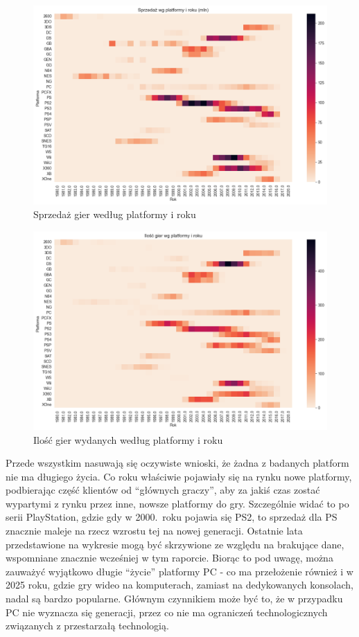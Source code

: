 \documentclass[11pt]{article}
\begin{document}
\begin{figure}[H]
    \centering
    \includegraphics[width=\linewidth]{figures/rokplatforma-sprzedaz}
    \caption{Sprzedaż gier według platformy i roku}
    \label{fig:platform-year-sales}
\end{figure}

\begin{figure}[H]
    \centering
    \includegraphics[width=\linewidth]{figures/rokplatforma-ilosc}
    \caption{Ilość gier wydanych według platformy i roku}
    \label{fig:platform-year-count}
\end{figure}

Przede wszystkim nasuwają się oczywiste wnioski, że żadna z badanych platform nie ma długiego życia.
Co roku właściwie pojawiały się na rynku nowe platformy, podbierając część klientów od ``głównych graczy'', aby za jakiś czas zostać wypartymi z rynku przez inne, nowsze platformy do gry.
Szczególnie widać to po serii PlayStation, gdzie gdy w 2000.~roku pojawia się PS2, to sprzedaż dla PS znacznie maleje na rzecz wzrostu tej na nowej generacji.
Ostatnie lata przedstawione na wykresie mogą być skrzywione ze względu na brakujące dane, wspomniane znacznie wcześniej w tym raporcie.
Biorąc to pod uwagę, można zauważyć wyjątkowo długie ``życie'' platformy PC - co ma przełożenie również i w 2025 roku, gdzie gry wideo na komputerach, zamiast na dedykowanych konsolach, nadal są bardzo popularne.
Głównym czynnikiem może być to, że w przypadku PC nie wyznacza się generacji, przez co nie ma ograniczeń technologicznych związanych z przestarzałą technologią.
\end{document}
